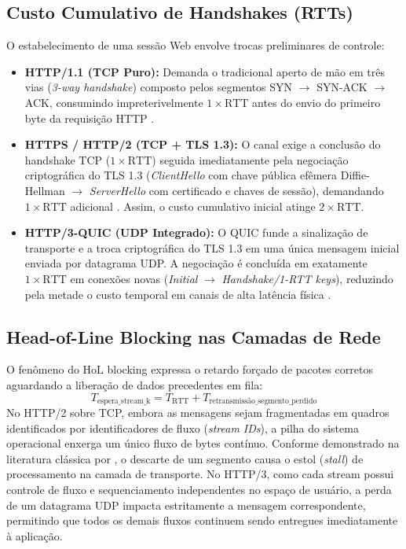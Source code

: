 \documentclass[12pt]{article}
\begin{document}
\subsection{Custo Cumulativo de Handshakes (RTTs)}
O estabelecimento de uma sessão Web envolve trocas preliminares de controle:
\begin{itemize}
    \item \textbf{HTTP/1.1 (TCP Puro):} Demanda o tradicional aperto de mão em três vias (\textit{3-way handshake}) composto pelos segmentos SYN $\to$ SYN-ACK $\to$ ACK, consumindo impreterivelmente $1 \times \text{RTT}$ antes do envio do primeiro byte da requisição HTTP \cite{rfc793}.
    \item \textbf{HTTPS / HTTP/2 (TCP + TLS 1.3):} O canal exige a conclusão do handshake TCP ($1 \times \text{RTT}$) seguida imediatamente pela negociação criptográfica do TLS 1.3 (\textit{ClientHello} com chave pública efêmera Diffie-Hellman $\to$ \textit{ServerHello} com certificado e chaves de sessão), demandando $1 \times \text{RTT}$ adicional \cite{rfc8446}. Assim, o custo cumulativo inicial atinge $2 \times \text{RTT}$.
    \item \textbf{HTTP/3-QUIC (UDP Integrado):} O QUIC funde a sinalização de transporte e a troca criptográfica do TLS 1.3 em uma única mensagem inicial enviada por datagrama UDP. A negociação é concluída em exatamente $1 \times \text{RTT}$ em conexões novas (\textit{Initial} $\to$ \textit{Handshake/1-RTT keys}), reduzindo pela metade o custo temporal em canais de alta latência física \cite{rfc9000}.
\end{itemize}

\subsection{Head-of-Line Blocking nas Camadas de Rede}
O fenômeno do HoL blocking expressa o retardo forçado de pacotes corretos aguardando a liberação de dados precedentes em fila:
\begin{equation}
    T_{\text{espera\_stream\_k}} = T_{\text{RTT}} + T_{\text{retransmissão\_segmento\_perdido}}
\end{equation}
No HTTP/2 sobre TCP, embora as mensagens sejam fragmentadas em quadros identificados por identificadores de fluxo (\textit{stream IDs}), a pilha do sistema operacional enxerga um único fluxo de bytes contínuo. Conforme demonstrado na literatura clássica por \cite{tanenbaum2021}, o descarte de um segmento causa o estol (\textit{stall}) de processamento na camada de transporte. No HTTP/3, como cada stream possui controle de fluxo e sequenciamento independentes no espaço de usuário, a perda de um datagrama UDP impacta estritamente a mensagem correspondente, permitindo que todos os demais fluxos continuem sendo entregues imediatamente à aplicação.
\end{document}
